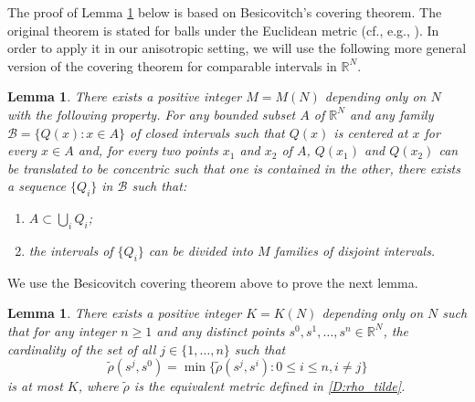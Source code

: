 \documentclass[11pt, reqno]{amsart}
\newtheorem{lemma}[theorem]{Lemma}
\def\R{{\mathbb R}}
\numberwithin{equation}{section}
\begin{document}
The proof of Lemma \ref{Lem:K} below is based on Besicovitch's covering theorem.
The original theorem is stated for balls under the Euclidean metric (cf., e.g., \cite[p.30]{M}). 
In order to apply it in our anisotropic setting, we will use the following more general version of the covering 
theorem for comparable intervals in $\R^N$. 

\begin{lemma}\label{Lem:cov_thm}\cite[ Theorem 1.1 and Remark 5]{G75}
There exists a positive integer $M = M(N)$ depending only on $N$ with the following property.
For any bounded subset $A$ of $\R^N$ and any family $\mathscr{B} = \{Q(x) : x \in A \}$ of closed intervals 
such that $Q(x)$ is centered at $x$ for every $x \in A$ and, for every two points $x_1$ and $x_2$ of $A$, 
$Q(x_1)$ and $Q(x_2)$ can be translated to be concentric such  that one is contained in the other, 
there exists a sequence $\{Q_i\}$ in $\mathscr{B}$ such that:
\begin{enumerate}
\item[$(i)$] $A\subset \bigcup_i Q_i$;
\item[$(ii)$] the intervals of $\{Q_i\}$ can be divided into $M$ families of disjoint intervals.
\end{enumerate}
\end{lemma}

We use the Besicovitch covering theorem above to prove the next lemma.

\begin{lemma}\label{Lem:K}
There exists a positive integer $K = K(N)$ depending only on $N$ such that for any integer $n \ge 1$ and any 
distinct points $s^0, s^1, \dots, s^n \in \R^N$, the cardinality of the set of all $j \in \{1, \dots, n\}$ such that
\begin{equation}\label{Eq:min_rho_tilde}
\tilde{\rho}(s^j, s^0) = \min\{ \tilde{\rho}(s^j, s^i) : 0 \le i \le n, i \ne j \}
\end{equation}
is at most $K$, where $\tilde\rho$ is the equivalent metric defined in \eqref{D:rho_tilde}.
\end{lemma}
\end{document}
